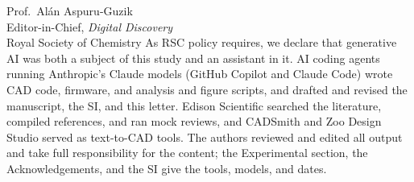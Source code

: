 \documentclass[11pt]{letter}
\begin{document}
\begin{letter}{Prof.\ Al\'an Aspuru-Guzik\\
Editor-in-Chief, \textit{Digital Discovery}\\
Royal Society of Chemistry}
As RSC policy requires, we declare that generative AI was both a subject of this study and an assistant in it. AI coding agents running Anthropic's Claude models (GitHub Copilot and Claude Code) wrote CAD code, firmware, and analysis and figure scripts, and drafted and revised the manuscript, the SI, and this letter. Edison Scientific searched the literature, compiled references, and ran mock reviews, and CADSmith and Zoo Design Studio served as text-to-CAD tools. The authors reviewed and edited all output and take full responsibility for the content; the Experimental section, the Acknowledgements, and the SI give the tools, models, and dates.


\end{letter}
\end{document}
